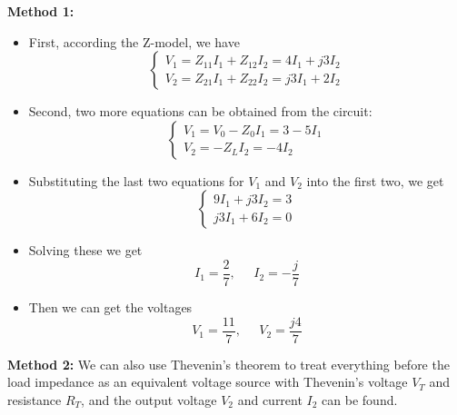 \begin{itemize}

{\bf Method 1:} 
\begin{itemize}
\item First, according the Z-model, we have
  \[
  \left\{ \begin{array}{l} V_1=Z_{11}I_1+Z_{12}I_2= 4I_1+j3I_2 \\
    V_2=Z_{21}I_1+Z_{22}I_2=j3I_1+ 2I_2 \end{array} \right.	
  \]
\item Second, two more equations can be obtained from the circuit:
  \[
  \left\{ \begin{array}{l} V_1=V_0-Z_0 I_1=3-5I_1 \\
    V_2=-Z_L I_2=-4 I_2 \end{array} \right.	
  \]
\item Substituting the last two equations for $V_1$ and $V_2$ into the 
  first two, we get
  \[
  \left\{ \begin{array}{l} 9I_1+j3I_2=3 \\ j3I_1+6I_2=0 \end{array} \right. 
  \]
\item Solving these we get 
  \[
  I_1=\frac{2}{7},\;\;\;\;\;I_2=-\frac{j}{7} 
  \]
\item Then we can get the voltages
  \[
  V_1=\frac{11}{7},\;\;\;\;\;V_2=\frac{j4}{7} 
  \]
\end{itemize}

{\bf Method 2:} We can also use Thevenin's theorem to treat everything 
before the load impedance as an equivalent voltage source with Thevenin's 
voltage $V_T$ and resistance $R_T$, and the output voltage $V_2$ and 
current $I_2$ can be found.


\end{itemize}
